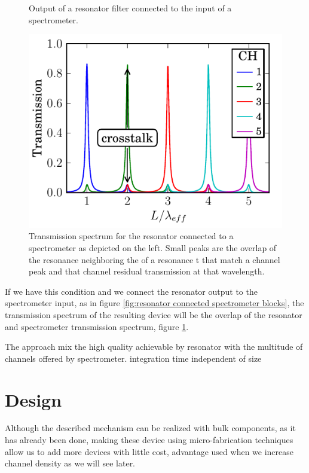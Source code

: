\documentclass[12pt,twoside,english]{book}
\renewcommand{\~}{\perispomeni}%
\numberwithin{equation}{section}
\numberwithin{figure}{section}
\begin{document}
\begin{figure}[h]
	\begin{minipage}[t]{0.49\columnwidth}%
	
	\caption{Output of a resonator filter connected to the input of a spectrometer.}
	\label{fig:resonator connected spectrometer blocks}
	\end{minipage}\hfill
	\begin{minipage}[t]{0.49\columnwidth}%
	\includegraphics{ring-enhaced-tog}
	\caption{Transmission spectrum for the resonator connected to a spectrometer as depicted on the left. Small peaks are the overlap of the resonance neighboring the of a resonance t that match a channel peak and that channel residual transmission at that wavelength.}
	\label{fig:spectrum resonator connected spectrometer}
	\end{minipage}
\end{figure}
If we have this condition and we connect the resonator output to the spectrometer input, as in figure \ref{fig:resonator connected spectrometer blocks}, the transmission spectrum of the resulting device will be the overlap of the resonator and spectrometer transmission spectrum, figure \ref{fig:spectrum resonator connected spectrometer}.

The approach mix the high quality achievable by resonator with the multitude of channels offered by spectrometer.
integration time independent of size

\section{Design}
Although the described mechanism can be realized with bulk components, as it has already been done\cite{bajraszewski:2008p1743}, making these device using micro-fabrication techniques allow us to add more devices with little cost, advantage used when we increase channel density as we will see later.
\end{document}
